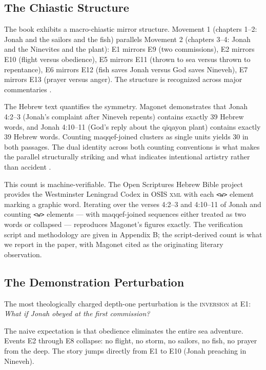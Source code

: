 \documentclass[11pt]{article}
\theoremstyle{rukha}
\begin{document}
\subsection{The Chiastic Structure}

The book exhibits a macro-chiastic mirror structure. Movement 1
(chapters 1–2: Jonah and the sailors and the fish) parallels Movement 2
(chapters 3–4: Jonah and the Ninevites and the plant): E1 mirrors E9
(two commissions), E2 mirrors E10 (flight versus obedience), E5 mirrors
E11 (thrown to sea versus thrown to repentance), E6 mirrors E12 (fish
saves Jonah versus God saves Nineveh), E7 mirrors E13 (prayer versus
anger). The structure is recognized across major commentaries
\cite{trible, sasson, magonet}.

The Hebrew text quantifies the symmetry. Magonet \cite{magonet}
demonstrates that Jonah 4:2–3 (Jonah's complaint after Nineveh repents)
contains exactly 39 Hebrew words, and Jonah 4:10–11 (God's reply about
the qiqayon plant) contains exactly 39 Hebrew words. Counting maqqef-joined
clusters as single units yields 30 in both passages. The dual identity
across both counting conventions is what makes the parallel structurally
striking and what indicates intentional artistry rather than accident
\cite{magonettorah}.

This count is machine-verifiable. The Open Scriptures Hebrew Bible
project \cite{oshb} provides the Westminster Leningrad Codex in OSIS
\textsc{xml} with each \texttt{<w>} element marking a graphic word.
Iterating over the verses 4:2–3 and 4:10–11 of Jonah and counting
\texttt{<w>} elements --- with maqqef-joined sequences either treated as
two words or collapsed --- reproduces Magonet's figures exactly.
The verification script and methodology are given in Appendix B; the
script-derived count is what we report in the paper, with Magonet cited as
the originating literary observation.

\subsection{The Demonstration Perturbation}

The most theologically charged depth-one perturbation is the
\textsc{inversion} at E1: \emph{What if Jonah obeyed at the first
commission?}

The naive expectation is that obedience eliminates the entire sea
adventure. Events E2 through E8 collapse: no flight, no storm, no
sailors, no fish, no prayer from the deep. The story jumps directly
from E1 to E10 (Jonah preaching in Nineveh).
\end{document}
